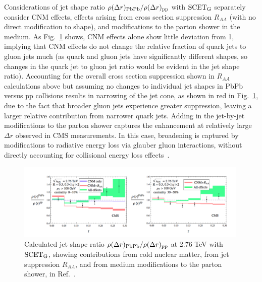 Considerations of jet shape ratio $\rho(\Delta r)_{\rm PbPb}/\rho(\Delta r)_{\rm pp}$  with $\rm SCET_{G}$ separately consider CNM effects, effects arising from cross section suppression $R_{AA}$ (with no direct modification to shape), and modifications to the parton shower in the medium.  As Fig.~\ref{fig:SCET_jet_shape} shows, CNM effects alone show little deviation from 1, implying that CNM effects do not change the relative fraction of quark jets to gluon jets much (as quark and gluon jets have significantly different shapes, so changes in the quark jet to gluon jet ratio would be evident in the jet shape ratio).  Accounting for the overall cross section suppression shown in $R_{AA}$ calculations above but assuming no changes to individual jet shapes in PbPb versus pp collisions results in narrowing of the jet cone, as shown in red in Fig.~\ref{fig:SCET_jet_shape}, due to the fact that broader gluon jets experience greater suppression, leaving a larger relative contribution from narrower quark jets.  Adding in the jet-by-jet modifications to the parton shower captures the enhancement at relatively large $\Delta r$ observed in CMS measurements.  In this case, broadening is captured by modifications to radiative energy loss via glauber gluon interactions, without directly accounting for collisional energy loss effects~\cite{Chien:2015hda}.  


\begin{figure}[ht!]
\begin{center}
\includegraphics[width=0.99\textwidth]{figures/Models/SCET_JetShapes.png}
\caption[Calculated jet shape ratio $\rho(\Delta r)_{\rm PbPb}/\rho(\Delta r)_{\rm pp}$ at 2.76 TeV with $\rm SCET_{G}$]{Calculated jet shape ratio $\rho(\Delta r)_{\rm PbPb}/\rho(\Delta r)_{\rm pp}$ at 2.76 TeV with $\rm SCET_{G}$, showing contributions from cold nuclear matter, from jet suppression $R_{AA}$, and from medium modifications to the parton shower, in Ref.~\cite{Chien:2015hda}.}
\label{fig:SCET_jet_shape}
\end{center}
\end{figure}

